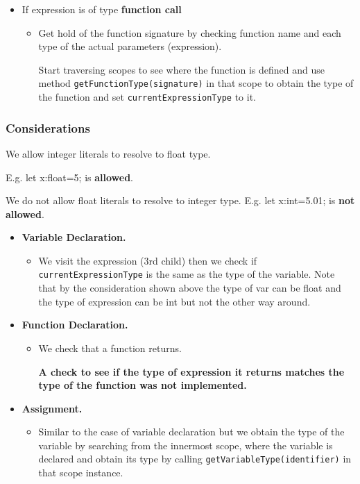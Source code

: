 \begin{itemize}
	\item If expression is of type \textbf{function call}
	      \begin{itemize}
	      	\item     Get hold of the function signature by checking function name and each type of the actual parameters (expression).
	      	      	      	      	      	          
	      	      Start traversing scopes to see where the function is defined and use method \verb!getFunctionType(signature)! in that scope to obtain the type of the function and set \verb!currentExpressionType! to it.
	      \end{itemize}
	      	      	      
	      	      	      
\end{itemize}




\subsubsection{Considerations}
We allow integer literals to resolve to float type. 

E.g. let x:float=5; is \textbf{allowed}.

We do not allow float literals to resolve to integer type. E.g. let x:int=5.01; is \textbf{not allowed}.


\begin{itemize}
	\item \textbf{Variable Declaration.}
	      \begin{itemize}
	      	\item We visit the expression (3rd child) then we check if \verb!currentExpressionType! is the same as the type of the variable. Note that by the consideration  shown above the type of var can be float and the type of expression can be int but not the other way around.
	      \end{itemize}
	\item \textbf{Function Declaration.}
	      \begin{itemize}
	      	\item We check that a function returns.
	      	      	      	      	      	              
	      	      	      	      	      	              
	      	      \textbf{A check to see if the type of expression it returns matches the type of the function was not implemented.}
	      \end{itemize}
	\item \textbf{Assignment.}
	      \begin{itemize}
	      	\item Similar to the case of variable declaration but we obtain the type of the variable by searching from the innermost scope, where the variable is declared and obtain its type by calling \verb!getVariableType(identifier)! in that scope instance.
	      \end{itemize}
	      	      	      
\end{itemize}






